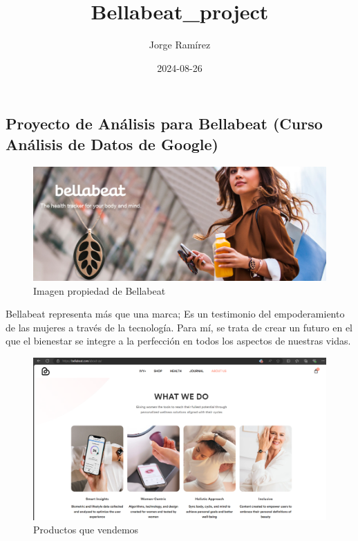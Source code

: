 \documentclass[
]{article}
\title{Bellabeat\_project}
\author{Jorge Ramírez}
\date{2024-08-26}
\begin{document}
\maketitle

{
\setcounter{tocdepth}{3}
\tableofcontents
}
\subsection{Proyecto de Análisis para Bellabeat (Curso Análisis de Datos
de
Google)}\label{proyecto-de-anuxe1lisis-para-bellabeat-curso-anuxe1lisis-de-datos-de-google}

\begin{figure}
\centering
\includegraphics{images/Bellabeat_head.png}
\caption{Imagen propiedad de Bellabeat}
\end{figure}

Bellabeat representa más que una marca; Es un testimonio del
empoderamiento de las mujeres a través de la tecnología. Para mí, se
trata de crear un futuro en el que el bienestar se integre a la
perfección en todos los aspectos de nuestras vidas.

\begin{figure}
\centering
\includegraphics{images/What_we_do.png}
\caption{Productos que vendemos}
\end{figure}
\end{document}
